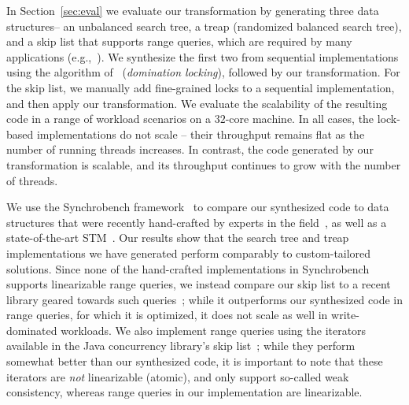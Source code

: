In Section~\ref{sec:eval} we evaluate our transformation by generating three data structures-- an unbalanced search tree, a treap
(randomized balanced search tree),
and a skip list that supports range queries, which are required by
many applications (e.g.,~\cite{levelDB,FerroJKRY14}). 
We synthesize the first two from sequential implementations using the algorithm of~\cite{Gueta2011} (\emph{domination locking}), followed by our transformation.
For the skip list, we manually 
add fine-grained locks to a sequential implementation, and then apply our transformation.
We evaluate the scalability of the resulting code
in a range of workload scenarios on a $32$-core machine.
In all cases, the lock-based implementations do not scale --
their throughput remains flat as the number of running threads increases. In contrast, the code generated by our transformation
is scalable, and its throughput continues to grow with the number of threads.

We use the Synchrobench framework~\cite{Gramoli2015} to 
compare our synthesized code to data structures that were recently hand-crafted by experts in the field~\cite{DrachslerVY2014,BronsonCCO2010,ConcurrentSkipList,EllenFRB2010,CrainGR2013}, 
as well as a state-of-the-art STM~\cite{DiceSS2006}.
Our results show that the search tree and treap implementations we have generated
perform comparably to custom-tailored solutions.
Since 
none of the hand-crafted implementations in Synchrobench supports linearizable range queries, we instead compare our 
skip list to a recent library geared towards such queries~\cite{BrownA12}; while it outperforms our synthesized code in range queries, for which it is optimized, it does not scale as well in 
write-dominated workloads. We also implement
range queries using the iterators available in the Java concurrency library's skip list~\cite{ConcurrentSkipList}; while they perform
somewhat better than our synthesized code, it is important to note that these iterators are \emph{not}
linearizable (atomic), and only support so-called weak consistency, whereas range queries in our implementation are linearizable.

%

